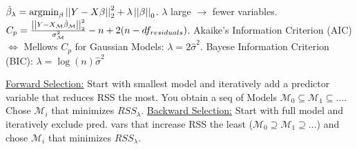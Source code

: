 \vspace{4pt}

$\hat{\beta}_\lambda = \text{argmin}_\beta \left\vert\left\vert Y - X \beta \right\vert\right\vert_2^2 + \lambda \left\vert\left\vert \beta \right\vert\right\vert_0$. $\lambda$ large $\rightarrow$ fewer variables. $C_p = \frac{\left\vert\left\vert Y - X_\mathcal{M} \hat{\beta}_{\mathcal{M}} \right\vert\right\vert_2^2}{\sigma_{\mathcal{M}}^2} - n + 2 (n-df_{residuals})$. Akaike's Information Criterion (AIC) $\Leftrightarrow$ Mellows $C_p$ for Gaussian Models: $\lambda = 2 \hat{\sigma}^2$. Bayese Information Criterion (BIC): $\lambda = \log(n) \hat{\sigma}^2$

\vspace{4pt}

\underline{Forward Selection:} Start with smallest model and iteratively add a predictor variable that reduces RSS the most. You obtain a seq of Models $\mathcal{M}_0 \subseteq \mathcal{M}_1 \subseteq \dots$. Chose $\mathcal{M}_i$ that minimizes $RSS_\lambda$. \underline{Backward Selection:} Start with full model and iteratively exclude pred. vars that increase RSS the least ($\mathcal{M}_0 \supseteq \mathcal{M}_1 \supseteq ...$) and chose $\mathcal{M}_i$ that minimizes $RSS_\lambda$.
